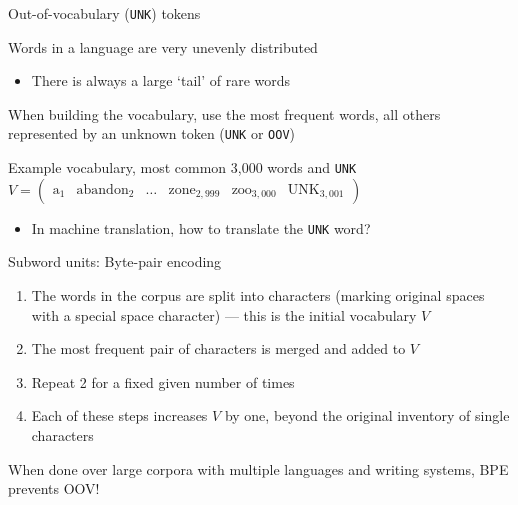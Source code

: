 \documentclass[12pt,aspectratio=169,handout]{beamer}
\begin{document}
\begin{frame}{Out-of-vocabulary (\texttt{UNK}) tokens}
	
Words in a language are very unevenly distributed

\begin{itemize}
	\item There is always a large `tail' of rare words
\end{itemize}

When building the vocabulary, use the most frequent words, all others represented by an unknown token (\texttt{UNK} or \texttt{OOV})


\begin{block}{Example vocabulary, most common 3,000 words and \texttt{UNK}}
$
V = \begin{pmatrix}
	\text{a}_1 & \text{abandon}_2 & \ldots & \text{zone}_{2,999} & \text{zoo}_{3,000} & \text{UNK}_{3,001}
\end{pmatrix}
$
\end{block}

\begin{itemize}
	\item In machine translation, how to translate the \texttt{UNK} word?
\end{itemize}


\end{frame}


\begin{frame}{Subword units: Byte-pair encoding}

\begin{enumerate}
	\item The words in the corpus are split into characters (marking original spaces with a special space character) --- this is the initial vocabulary $V$
	\item The most frequent pair of characters is merged and added to $V$
	\item Repeat 2 for a fixed given number of times
	\item Each of these steps increases $V$ by one, beyond the original inventory of single characters
\end{enumerate}

When done over large corpora with multiple languages and writing systems, BPE prevents OOV!

\end{frame}
\end{document}
